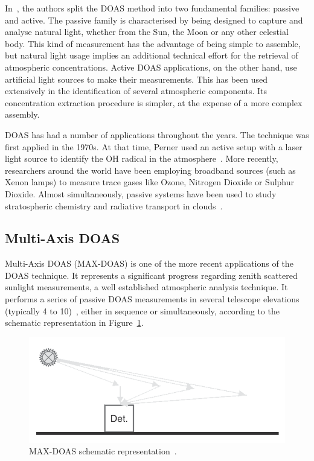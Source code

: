 In~\cite{Platt2007}, the authors split the DOAS method into two
fundamental families: passive and active. The passive family is
characterised by being designed to capture and analyse natural light,
whether from the Sun, the Moon or any other celestial body. This kind of
measurement has the advantage of being simple to assemble, but natural
light usage implies an additional technical effort for the retrieval of
atmospheric concentrations. Active DOAS applications, on the other hand,
use artificial light sources to make their measurements. This has been
used extensively in the identification of several atmospheric
components. Its concentration extraction procedure is simpler, at the
expense of a more complex assembly.

DOAS has had a number of applications throughout the years. The
technique was first applied in the 1970s. At that time, Perner used an
active setup with a laser light source to identify the OH radical in the
atmosphere~\cite{Perner1976}. More recently, researchers around the
world have been employing broadband sources (such as Xenon lamps) to
measure trace gases like Ozone, Nitrogen Dioxide or Sulphur Dioxide.
Almost simultaneously, passive systems have been used to study
stratospheric chemistry and radiative transport in
clouds~\cite{Platt2007}.

\subsection{Multi-Axis DOAS}%
\label{sub:multi_axis_doas}

Multi-Axis DOAS (MAX-DOAS) is one of the more recent applications of the
DOAS technique. It represents a significant progress regarding zenith
scattered sunlight measurements, a well established atmospheric analysis
technique. It performs a series of passive DOAS measurements in several
telescope elevations (typically 4 to 10)~\cite{Honninger2004}, either in
sequence or simultaneously, according to the schematic representation in
Figure~\ref{fig:max_doas}. 

\begin{figure}[htpb]
    \centering
    \includegraphics[width=0.8\linewidth]{img/maxdoas.png}
    \caption{MAX-DOAS schematic representation~\cite{Platt2007}.}
    \label{fig:max_doas}
\end{figure}


